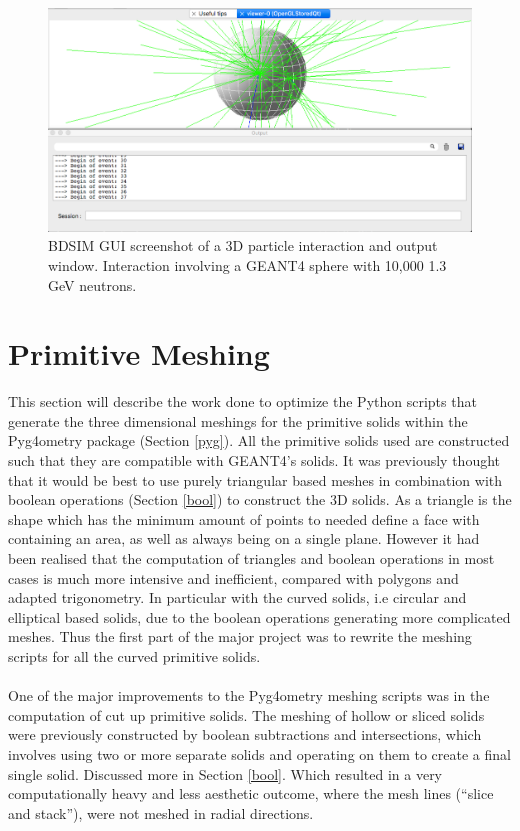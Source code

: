 \documentclass[12pt,a4paper]{article}
\begin{document}
\begin{figure}[h!]
\centering
\includegraphics[scale=0.4]{Images//BDSIM//screengrab.png}
\caption[width=\columnwidth]{BDSIM GUI screenshot of a 3D particle interaction and output window. Interaction involving a GEANT4 sphere with 10,000 1.3 GeV neutrons.}
\label{screengrab}
\end{figure}


\newpage
\section{Primitive Meshing}
\label{prim}
This section will describe the work done to optimize the Python scripts that generate the three dimensional meshings for the primitive solids within the Pyg4ometry package (Section \ref{pyg}). All the primitive solids used are constructed such that they are compatible with GEANT4's solids. It was previously thought that it would be best to use purely triangular based meshes in combination with boolean operations (Section \ref{bool}) to construct the 3D solids. As a triangle is the shape which has the minimum amount of points to needed define a face with containing an area, as well as always being on a single plane. However it had been realised that the computation of triangles and boolean operations in most cases is much more intensive and inefficient, compared with polygons and adapted trigonometry. In particular with the curved solids, i.e circular and elliptical based solids, due to the boolean operations generating more complicated meshes. Thus the first part of the major project was to rewrite the meshing scripts for all the curved primitive solids.
\\\\
One of the major improvements to the Pyg4ometry meshing scripts was in the computation of cut up primitive solids. The meshing of hollow or sliced solids were previously constructed by boolean subtractions and intersections, which involves using two or more separate solids and operating on them to create a final single solid. Discussed more in Section \ref{bool}. Which resulted in a very computationally heavy and less aesthetic outcome, where the mesh lines (``slice and stack''), were not meshed in radial directions.
\end{document}
